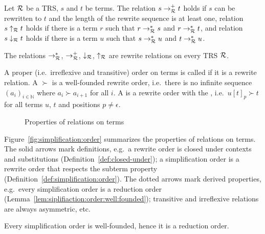 \begin{definition}
	Let \( \mathcal{R} \) be a TRS, \( s \) and \( t \) be terms.
	The relation \( s \rightarrow^+_{\mathcal{R}} t \) holds
	if \( s \) can be rewritten to \( t \)
	and the length of the rewrite sequence is at least one,
	relation \( s \uparrow_{\mathcal{R}} t \) holds if there is a term \( r \) such that
	\( r \rightarrow^*_{\mathcal{R}} s \) and \( r \rightarrow^*_{\mathcal{R}} t \), and
	relation \( s \downarrow_{\mathcal{R}} t\) holds if there is a term \( u \) such that
	\( s \rightarrow^*_{\mathcal{R}} u \) and \( t \rightarrow^*_{\mathcal{R}} u \).
\end{definition}
\begin{lemma}
	The relations \( \rightarrow^*_{\mathcal{R}} \),
	\( \rightarrow^+_{\mathcal{R}} \),
	\( \downarrow_{\mathcal{R}} \), \( \uparrow_{\mathcal{R}} \) are rewrite relations on every TRS \( \mathcal{R} \).
\end{lemma}
\begin{definition}\label{def:simplification:order}
	A proper (i.e.~irreflexive and transitive) order on terms is called  if it is a rewrite relation.
	A  \( \succ \) is a well-founded rewrite order,
	i.e.~there is no infinite sequence
	\( {(a_i)}_{i\in\mathbb{N}} \)
	where \( a_i\succ a_{i+1} \) for all \( i \).
	A  is a rewrite order with the ,
	i.e.~\( u{[t]}_p \succ t \) for all terms \( u \), \( t \) and positions \( p\neq\epsilon \).
\end{definition}

\begin{figure}[htb]\label{fig:simplification:order}
	
	\caption{Properties of relations on terms}
\end{figure}

Figure~\vref{fig:simplification:order} summarizes the properties of relations on terms.
The solid arrows mark definitions,
e.g.~a rewrite order is closed under contexts and substitutions (Definition~\ref{def:closed-under});
a simplification order is a rewrite order
that respects the subterm property
(Definition~\ref{def:simplification:order}).
The dotted arrows mark derived properties,
e.g.~every simplification order is a reduction order
(Lemma~\ref{lem:siplifiaction:order:well:founded});
transitive and irreflexive relations are always asymmetric,
etc.

\begin{lemma}\label{lem:siplifiaction:order:well:founded}
	Every simplification order is well-founded, hence it is a reduction order.
\end{lemma}


